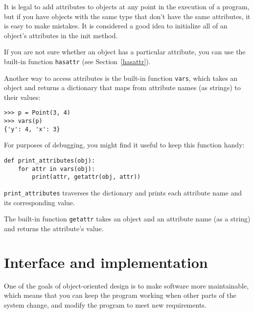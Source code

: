 It is legal to add attributes to objects at any point in the execution
of a program, but if you have objects with the same type that don't
have the same attributes, it is easy to make mistakes.
It is considered a good idea to
initialize all of an object's attributes in the init method.

If you are not sure whether an object has a particular attribute, you
can use the built-in function {\tt hasattr} (see Section~\ref{hasattr}).

Another way to access attributes is the built-in function {\tt vars},
which takes an object and returns a dictionary that maps from
attribute names (as strings) to their values:

\begin{lstlisting}
>>> p = Point(3, 4)
>>> vars(p)
{'y': 4, 'x': 3}
\end{lstlisting}

%
For purposes of debugging, you might find it useful to keep this
function handy:

\begin{lstlisting}
def print_attributes(obj):
    for attr in vars(obj):
        print(attr, getattr(obj, attr))
\end{lstlisting}

%
\verb"print_attributes" traverses the dictionary
and prints each attribute name and its corresponding value.

The built-in function {\tt getattr} takes an object and an attribute
name (as a string) and returns the attribute's value.


\section{Interface and implementation}

One of the goals of object-oriented design is to make software more
maintainable, which means that you can keep the program working when
other parts of the system change, and modify the program to meet new
requirements.

